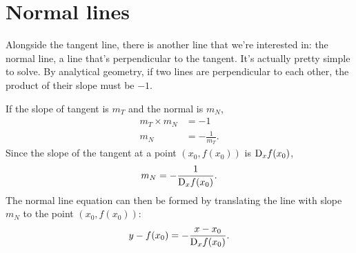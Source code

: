 \section{Normal lines}
\label{sec:normal-lines}

Alongside the tangent line, there is another line that we're interested in: the normal line, a line that's perpendicular to the tangent. It's actually pretty simple to solve. By analytical geometry, if two lines are perpendicular to each other, the product of their slope must be $-1$.

If the slope of tangent is $m_T$ and the normal is $m_N$,
\begin{align}
	m_T \times m_N &= -1 \\
	m_N &= -\frac{1}{m_T}.
\end{align}
Since the slope of the tangent at a point $(x_0, f(x_0))$ is $\mdif{x}f(x_0)$,
\begin{equation}
	m_N = -\frac{1}{\mdif{x}f(x_0)}.
\end{equation}
The normal line equation can then be formed by translating the line with slope $m_N$ to the point $(x_0, f(x_0))$:
\begin{equation}
	y - f(x_0) = -\frac{x - x_0}{\mdif{x}f(x_0)}.
\end{equation}
